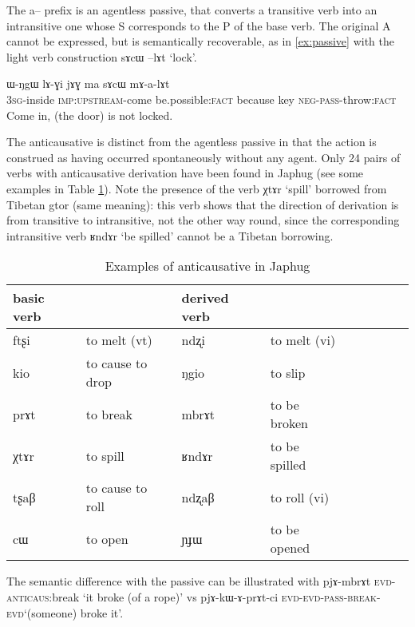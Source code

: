 \documentclass[oldfontcommands,oneside,a4paper,11pt]{article}
\newcommand{\ipa}[1]{{\phon #1}} %
\begin{document}
The  \ipa{a--} prefix is an agentless passive, that converts a transitive verb into an intransitive one whose S corresponds to the P of the base verb. The original A cannot be expressed, but is semantically recoverable, as in \ref{ex:passive} with the light verb construction \ipa{sɤcɯ --lɤt} `lock'. 

\begin{exe}
\ex \label{ex:passive}
\gll 
\ipa{ɯ-ŋgɯ} 	\ipa{lɤ-ɣi} 	\ipa{jɤɣ} 	\ipa{ma} 	\ipa{sɤcɯ} 	\ipa{mɤ-a-lɤt} \\
\textsc{3sg}-inside \textsc{imp:upstream}-come  be.possible:\textsc{fact} because key \textsc{neg-pass}-throw:\textsc{fact} \\
\glt Come in, (the door) is not locked.
\end{exe}

The anticausative is distinct from the agentless passive in that the action is construed as having occurred spontaneously without any agent. Only 24 pairs of verbs with anticausative derivation have been found in Japhug (see some examples in Table \ref{tab:anticausative}). Note the presence of the verb \ipa{χtɤr} `spill' borrowed from Tibetan \ipa{gtor} (same meaning): this verb shows that the direction of derivation is from transitive to intransitive, not the other way round, since the corresponding intransitive verb \ipa{ʁndɤr} `be spilled' cannot be a Tibetan borrowing.


\begin{table}[H]
\caption{Examples of anticausative in Japhug}\label{tab:anticausative}
\begin{tabular}{lllllllll} \toprule
basic verb  & &derived  verb &\\
\midrule
\ipa{ftʂi}  &	to melt (vt)	&		\ipa{ndʐi}  &	to melt (vi)		\\
\ipa{kio}  &	to cause to drop	&		\ipa{ŋgio}  &	to slip		\\
\ipa{prɤt}  &	to break	&		\ipa{mbrɤt}  &		to be broken	\\
\ipa{χtɤr}  &	 to spill	&		\ipa{ʁndɤr}  &		to be spilled	\\
\ipa{tʂaβ}  &	to cause to roll	&		\ipa{ndʐaβ}  &	to roll (vi)		\\
   \ipa{cɯ}  &	 to open 	&		\ipa{ɲɟɯ}  &	 to be opened	 	\\ 
 \bottomrule
\end{tabular}
\end{table}

The semantic difference with the passive can be illustrated with \ipa{pjɤ-mbrɤt} \textsc{evd-anticaus}:break `it broke (of a rope)' vs \ipa{pjɤ-kɯ-ɤ-prɤt-ci} \textsc{evd-evd-pass-break}-\textsc{evd}`(someone) broke it'.
\end{document}
